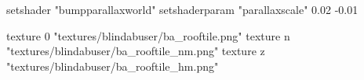 	setshader "bumpparallaxworld"
	setshaderparam "parallaxscale" 0.02 -0.01

    texture 0 "textures/blindabuser/ba_rooftile.png"
    texture n "textures/blindabuser/ba_rooftile_nm.png"
    texture z "textures/blindabuser/ba_rooftile_hm.png"

